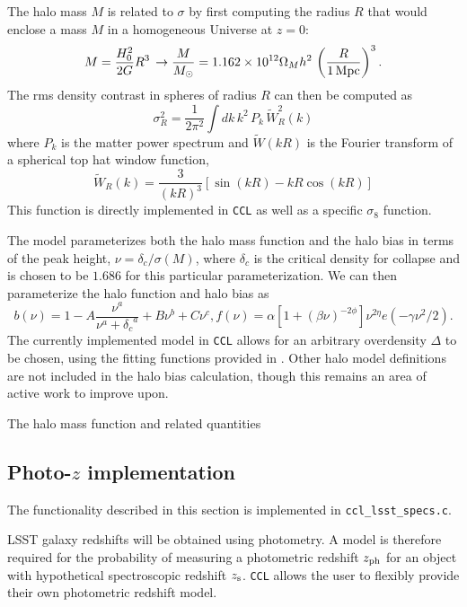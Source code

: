 \documentclass[\docopts]{\docclass}
\newcommand{\ccl}{{\tt CCL}\xspace}
\begin{document}
The halo mass $M$ is related to $\sigma$ by first computing the radius $R$ that would enclose a mass $M$ in a homogeneous Universe at $z=0$:
\begin{equation}
  M=\frac{H_0^2}{2G}R^3\,\rightarrow \frac{M}{M_\odot}=1.162\times10^{12}\Omega_Mh^2\,\left(\frac{R}{1\,{\rm Mpc}}\right)^3.
\end{equation}
The rms density contrast in spheres of radius $R$ can then be computed as
\begin{equation}
  \sigma_R^2 = \frac{1}{2\pi^2}\int dk\,k^2\,P_k\,\tilde{W}_R^2(k)
  \label{eq:sigR}
\end{equation}
where $P_k$ is the matter power spectrum and $\tilde{W}(kR)$ is the Fourier transform of a spherical top hat window function,
\begin{equation}
\tilde{W}_R(k) = \frac{3}{(kR)^3}[\sin(kR)-kR\cos(kR)]
\end{equation}
%
This function is directly implemented in \ccl as well as a specific $\sigma_8$ function.

The \citet{Tinker2010} model parameterizes both the halo mass function and the halo bias in terms of the peak height, $\nu = \delta_c / \sigma(M)$, where $\delta_c$ is the critical density for collapse and is chosen to be $1.686$ for this particular parameterization. We can then parameterize the halo function and halo bias as
\begin{equation}
  b(\nu) = 1 - A\frac{\nu^a}{\nu^a + {\delta_c}^a} + B\nu^b+C\nu^c,
  f(\nu) = \alpha[1+(\beta\nu)^{-2\phi}]\nu^{2\eta}e(-\gamma\nu^2/2).
\end{equation}
The currently implemented model in \ccl allows for an arbitrary overdensity $\Delta$ to be chosen, using the fitting functions provided in \citet{Tinker2010}. Other halo model definitions are not included in the halo bias calculation, though this remains an area of active work to improve upon.

The halo mass function and related quantities

\subsection{Photo-$z$ implementation}
\label{sec:photoz}
The functionality described in this section is implemented in {\tt ccl\_lsst\_specs.c}.

LSST galaxy redshifts will be obtained using photometry. A model is therefore required for the probability of measuring a photometric redshift $z_{\rm ph}$ for an object with hypothetical spectroscopic redshift $z_{\rm s}$. \ccl allows the user to flexibly provide their own photometric redshift model.
\end{document}
